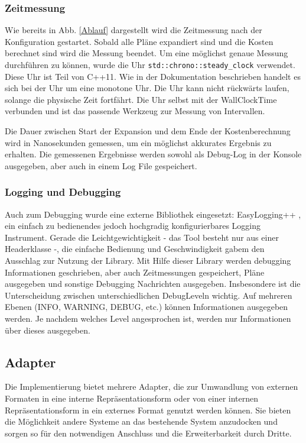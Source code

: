 \subsubsection{Zeitmessung}
Wie bereits in Abb. \ref{Ablauf} dargestellt wird die Zeitmessung nach der Konfiguration gestartet. Sobald alle Pläne expandiert sind und die Kosten berechnet sind wird die Messung beendet. Um eine möglichst genaue Messung durchführen zu können, wurde die Uhr \texttt{std::chrono::steady\_clock} verwendet. Diese Uhr ist Teil von C++11. Wie in der Dokumentation \cite{cppreference_2015_clock} beschrieben handelt es sich bei der Uhr um eine monotone Uhr. Die Uhr kann nicht rückwärts laufen, solange die physische Zeit fortfährt. Die Uhr selbst mit der Wall\-Clock\-Time verbunden und ist das passende Werkzeug zur Messung von Intervallen. 

Die Dauer zwischen Start der Expansion und dem Ende der Kostenberechnung wird in Nanosekunden gemessen, um ein möglichst akkurates Ergebnis zu erhalten. Die gemessenen Ergebnisse werden sowohl als Debug-Log in der Konsole ausgegeben, aber auch in einem Log File gespeichert.



\subsubsection{Logging und Debugging}

Auch zum Debugging wurde eine externe Bibliothek eingesetzt: EasyLogging++ \cite{easylogging}, ein einfach zu bedienendes jedoch hochgradig konfigurierbares Logging Instrument. Gerade die Leichtgewichtigkeit - das Tool besteht nur aus einer Headerklasse -, die einfache Bedienung und Geschwindigkeit gabem den Ausschlag zur Nutzung der Library. Mit Hilfe dieser Library werden debugging Informationen geschrieben, aber auch Zeitmessungen gespeichert, Pläne ausgegeben und sonstige Debugging Nachrichten ausgegeben. Insbesondere ist die Unterscheidung zwischen unterschiedlichen Debug\-Leveln wichtig. Auf mehreren Ebenen (INFO, WARNING, DEBUG, etc.) können Informationen ausgegeben werden. Je nachdem welches Level angesprochen ist, werden nur Informationen über dieses ausgegeben. 


\subsection{Adapter}

Die Implementierung bietet mehrere Adapter, die zur Umwandlung von externen Formaten in eine interne Repräsentationsform oder von einer internen Repräsentationsform in ein externes Format genutzt werden können. Sie bieten die Möglichkeit andere Systeme an das bestehende System anzudocken und sorgen so für den notwendigen Anschluss und die Erweiterbarkeit durch Dritte.

